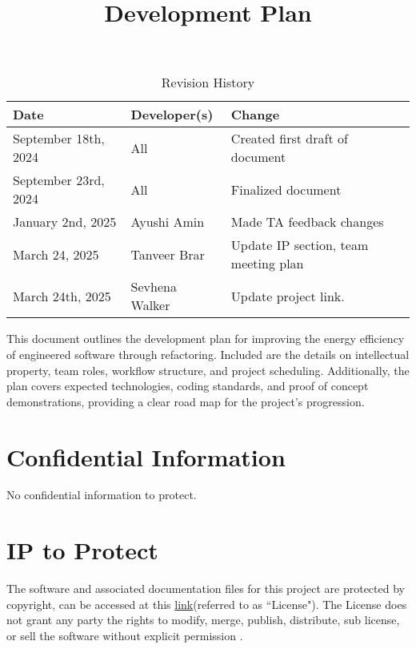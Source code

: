 \documentclass{article}
\title{Development Plan\\ \progname}
\author{\authname}
\date{}
\begin{document}
\maketitle

\begin{table}[hp]
  \caption{Revision History} \label{TblRevisionHistory}
  \begin{tabularx}{\textwidth}{llX}
    \toprule
    \textbf{Date} & \textbf{Developer(s)} & \textbf{Change}\\
    \midrule
    September 18th, 2024 & All & Created first draft of document\\
    September 23rd, 2024 & All & Finalized document\\
    January 2nd, 2025 & Ayushi Amin & Made TA feedback changes\\
    March 24, 2025 & Tanveer Brar & Update IP section, team meeting plan\\ 
    March 24th, 2025 & Sevhena Walker & Update project link.\\
    \bottomrule
  \end{tabularx}
\end{table}

\newpage{}

\noindent
This document outlines the development plan for improving the energy efficiency of
engineered software through refactoring. Included are the details on intellectual property,
team roles, workflow structure, and project scheduling. Additionally, the plan covers
expected technologies, coding standards, and proof of concept demonstrations, providing
a clear road map for the project's progression.

\section{Confidential Information}

No confidential information to protect.
\section{IP to Protect}

\hspace{\parindent}The software and associated documentation files for this project are protected by copyright, can be accessed at this \href{https://github.com/ssm-lab/capstone--source-code-optimizer/blob/main/LICENSE}{ link}(referred to as ``License"). The License does not grant any party the rights to modify, merge, publish, distribute, sub license, or sell the software without explicit permission .
\end{document}
